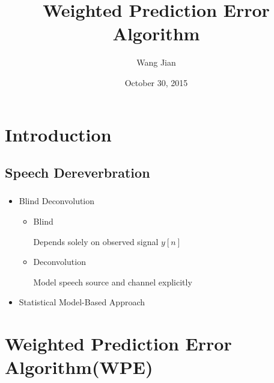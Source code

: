 \documentclass{beamer}
\title{Weighted Prediction Error Algorithm}
\author{Wang Jian}
\date{October 30, 2015}
\begin{document}

\frame{\titlepage}

\section[Outline]{}
\frame{\tableofcontents}

\section{Introduction}
\subsection{Speech Dereverbration}
\frame
{
  \frametitle{\subsecname}
  
  \begin{itemize}
  \item<1-3>{Blind Deconvolution}
      \begin{itemize}
      \item<2>{Blind} 
      
        Depends solely on observed signal $y[n]$
      
      \item<3>{Deconvolution} 
      
        Model speech source and channel explicitly
      
      \end{itemize}
 
  \item<4>{Statistical Model-Based Approach}
  

  \end{itemize}
}

\section{Weighted Prediction Error Algorithm(WPE)}
\end{document}

